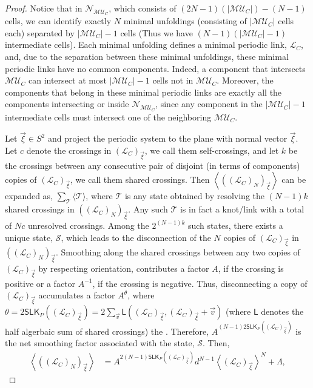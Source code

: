\documentclass[10pt,a4paper]{amsart}
\begin{document}
\begin{proof}
Notice that in $\mathcal{N}_{\mathcal{MU}_C}$, which consists of $(2N-1)( |\mathcal{MU}_C|) - (N-1)$ cells, we can identify exactly $N$ minimal unfoldings (consisting of $|\mathcal{MU}_C|$ cells each) separated by $|\mathcal{MU}_C|-1$ cells (Thus we have $(N-1)(|\mathcal{MU}_C|-1)$ intermediate cells). Each minimal unfolding defines a minimal periodic link, $\displaystyle \mathcal{L}_C$, and, due to the separation between these minimal unfoldings, these minimal periodic links have no common components. Indeed, a component that intersects $\mathcal{MU}_C$ can intersect at most $|\mathcal{MU}_C|-1$ cells not in $\mathcal{MU}_C$. Moreover, the components that belong in these minimal periodic links are exactly all the components intersecting or inside $\mathcal{N}_{\mathcal{MU}_C}$, since any component in the $|\mathcal{MU}_C|-1$ intermediate cells must intersect one of the neighboring $\mathcal{MU}_C$.

Let $\vec{\xi}\in S^2$ and project the periodic system to the plane with normal vector $\vec{\xi}$. Let $c$ denote the crossings in ${(\mathcal{L}_C)}_{\vec{\xi}}$, we call them self-crossings, and let $k$ be the crossings between any consecutive pair of disjoint (in terms of components) copies of $\displaystyle {(\mathcal{L}_C)}_{\vec{\xi}}$, we call them shared crossings.  Then
 $\displaystyle \left \langle {((\mathcal{L}_C)_{N})}_{\vec{\xi}} \right \rangle$ can be expanded as, $\displaystyle \sum_{\mathcal{T}} \langle 
\mathcal{T} \rangle$, where $\mathcal{T}$ is any state obtained by resolving the $(N-1)k$ shared crossings in $\displaystyle {((\mathcal{L}_{C})_{N})}_{\vec{\xi}}$. Any such $\mathcal{T}$ is in fact a knot/link with a total of $\displaystyle Nc$ unresolved crossings.  Among the $2^{(N-1)k}$ such states, there exists a unique state, $\mathcal{S}$, which leads to the disconnection of  the $N$ copies of ${(\mathcal{L}_C)}_{\vec{\xi}}$ in  $\displaystyle {((\mathcal{L}_C)_{N})}_{\vec{\xi}}$. Smoothing along the shared crossings between any two copies of ${(\mathcal{L}_C)}_{\vec{\xi}}$ by respecting orientation, contributes a factor $A$, if the crossing is positive or a factor $A^{-1}$, if the crossing is negative. Thus, disconnecting a copy of  ${(\mathcal{L}_C)}_{\vec{\xi}}$ accumulates a factor $A^\theta$, where $\theta= 2\mathsf{SLK}_P({(\mathcal{L}_C)}_{\vec{\xi}})= 2\sum_{\vec{v}} \mathsf{L}({(\mathcal{L}_C)}_{\vec{\xi}}, {(\mathcal{L}_C)}_{\vec{\xi}} + \vec{v})$ (where $\mathsf{L}$ denotes the half algerbaic sum of shared crossings) the . Therefore, $A^{(N-1)2\mathsf{SLK}_P({(\mathcal{L}_C)}_{\vec{\xi}})}$ is the net smoothing factor associated with the state, $\mathcal{S}$. Then,
\begin{equation}
    \begin{split}\displaystyle
        \left\langle {((\mathcal{L}_C)_{N})}_{\vec{\xi}} \right\rangle  &= A^{2(N-1)\mathsf{SLK}_P({(\mathcal{L}_C)}_{\vec{\xi}})} d^{N-1} \left\langle {(\mathcal{L}_C)}_{\vec{\xi}} \right\rangle^N + \Lambda,
    \end{split}
    \label{eq-theta-lam}
\end{equation}


\end{proof}
\end{document}
